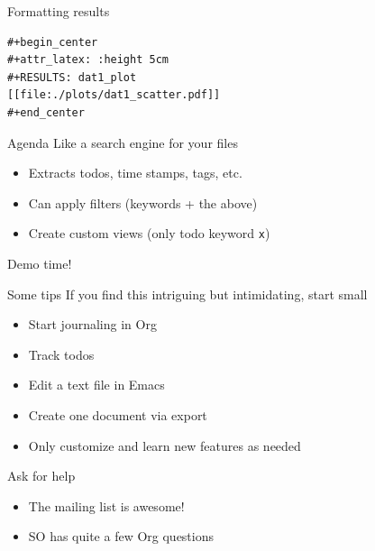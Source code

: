 \documentclass[aspectratio=169,presentation,bigger,fleqn,t]{beamer}
\begin{document}
\begin{frame}[fragile,label={sec:orgheadline20}]{Formatting results}
 \begin{verbatim}
#+begin_center
#+attr_latex: :height 5cm
#+RESULTS: dat1_plot
[[file:./plots/dat1_scatter.pdf]]
#+end_center
\end{verbatim}
\end{frame}

\begin{frame}[fragile,label={sec:orgheadline21}]{Agenda}
 Like a search engine for your files
\begin{itemize}
\item Extracts todos, time stamps, tags, etc.
\item Can apply filters (keywords + the above)
\item Create custom views (only todo keyword \texttt{x})
\end{itemize}
\end{frame}


\begin{frame}[label={sec:orgheadline22}]{}
\vspace{0.4\textheight}

\begin{center}
Demo time!
\end{center}
\end{frame}

\begin{frame}[label={sec:orgheadline23}]{Some tips}
If you find this intriguing but intimidating, start small
\begin{itemize}
\item Start journaling in Org
\item Track todos
\item Edit a text file in Emacs
\item Create one document via export
\item Only customize and learn new features as needed
\end{itemize}


Ask for help
\begin{itemize}
\item The mailing list is awesome!
\item SO has quite a few Org questions
\end{itemize}
\end{frame}
\end{document}
